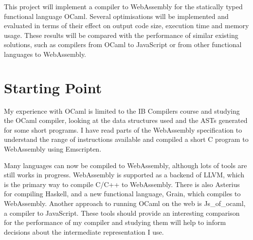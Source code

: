 \documentclass[12pt]{article}
\begin{document}
This project will implement a compiler to WebAssembly for the statically typed functional language OCaml. Several optimisations will be implemented and evaluated in terms of their effect on output code size, execution time and memory usage. These results will be compared with the performance of similar existing solutions, such as compilers from OCaml to JavaScript or from other functional languages to WebAssembly.



\section*{Starting Point}
My experience with OCaml is limited to the IB Compilers course and studying the OCaml compiler, looking at the data structures used and the ASTs generated for some short programs. I have read parts of the WebAssembly specification
to understand the range of instructions available and compiled a short C program to WebAssembly using Emscripten. %

Many languages can now be compiled to WebAssembly, although lots of tools are still works in progress. %
WebAssembly is supported as a backend of LLVM, which is the primary way to compile C/C++ to WebAssembly. There is also Asterius for compiling Haskell, and a new functional language, Grain, which compiles to WebAssembly. Another approach to running OCaml on the web is Js\_of\_ocaml, %
 a compiler to JavaScript. These tools should provide an interesting comparison for the performance of my compiler and studying them will help to inform decisions about the intermediate representation I use.
\end{document}
